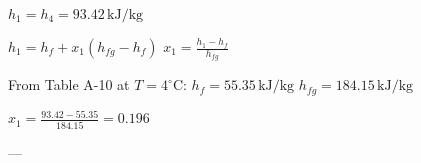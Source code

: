 \( h_1 = h_4 = 93.42 \, \text{kJ/kg} \)  

\( h_1 = h_f + x_1 (h_{fg} - h_f) \)  
\( x_1 = \frac{h_1 - h_f}{h_{fg}} \)  

From Table A-10 at \( T = 4^\circ \text{C} \):  
\( h_f = 55.35 \, \text{kJ/kg} \)  
\( h_{fg} = 184.15 \, \text{kJ/kg} \)  

\( x_1 = \frac{93.42 - 55.35}{184.15} = 0.196 \)  

---